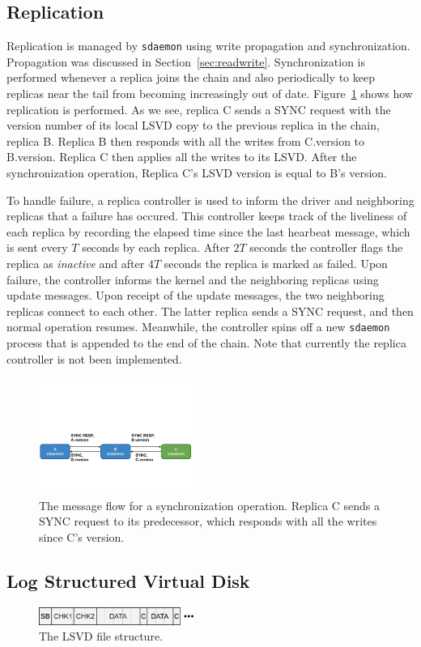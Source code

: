 \subsection{Replication}
\label{sec:replication}
Replication is managed by \texttt{sdaemon} using write propagation and 
synchronization. Propagation was discussed in Section~\ref{sec:readwrite}. 
Synchronization is performed whenever a replica joins the chain and also 
periodically to keep replicas near the tail from becoming increasingly out 
of date. Figure~\ref{fig:sync} shows how replication is performed. As we see,
replica C sends a SYNC request with the version number of its local LSVD 
copy to the previous replica in the chain, replica B. Replica B then responds
with all the writes from C.version to B.version. Replica C then applies all 
the writes to its LSVD. After the synchronization operation, Replica C's 
LSVD version is equal to B's version.

To handle failure, a replica controller is used to inform the driver and 
neighboring replicas that a failure has occured. This controller keeps track 
of the liveliness of each replica by recording the elapsed time since the 
last hearbeat message, which is sent every $T$ seconds by each replica. After
$2T$ seconds the controller flags the replica as \emph{inactive} and after 
$4T$ seconds the replica is marked as failed. Upon failure, the controller 
informs the kernel and the neighboring replicas using update messages. Upon
receipt of the update messages, the two neighboring replicas connect to each
other. The latter replica sends a SYNC request, and then normal operation 
resumes. Meanwhile, the controller spins off a new \texttt{sdaemon} process
that is appended to the end of the chain. Note that currently the replica 
controller is not been implemented.

\begin{figure}[t]
    \includegraphics[width=0.45\textwidth, trim=0 2in 0 3in, clip]{./figures/sync.pdf}
    \caption{The message flow for a synchronization operation. Replica C 
            sends a SYNC request to its predecessor, which responds with all
            the writes since C's version.}
    \label{fig:sync}
\end{figure}

\subsection{Log Structured Virtual Disk}
\label{sec:lsvd}


\begin{figure}[h]
    \includegraphics[width=0.45\textwidth, trim=0 3in 0 2in, clip]{./figures/lsvd.pdf}
    \caption{The LSVD file structure.}
    \label{fig:lsvd}
\end{figure}
